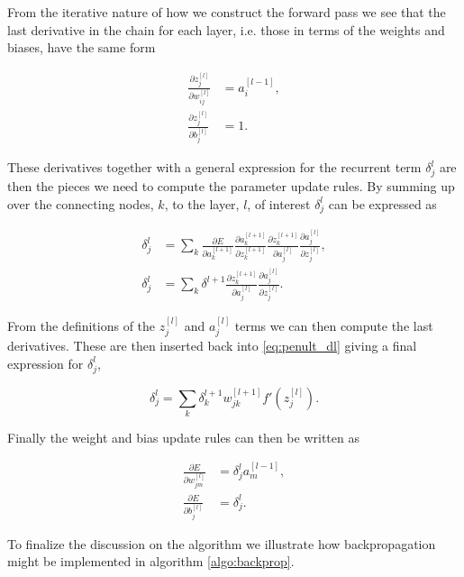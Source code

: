 \noindent From the iterative nature of how we construct the forward pass we see that the last derivative in the chain for each layer, i.e. those in terms of the weights and biases, have the same form 

\begin{align}
\frac{\partial z_j^{[l]}}{\partial w_{ij}^{[l]}} &= a^{[l-1]}_i, \\
\frac{\partial z_j^{[l]}}{\partial b_{j}^{[l]}} &= 1.
\end{align}

\noindent These derivatives together with a general expression for the recurrent term $\delta^l_j$ are then the pieces we need to compute the parameter update rules. By summing up over the connecting nodes, $k$, to the layer, $l$, of interest $\delta_j^l$ can be expressed as

\begin{align}
\delta_j^l &= 
\sum_k \frac{\partial E}{\partial a_k^{[l+1]}} 
\frac{\partial a_k^{[l+1]}}{\partial z_k^{[l+1]}} 
\frac{\partial z_k^{[l+1]}}{\partial a_j^{[l]}} 
\frac{\partial a_j^{[l]}}{\partial z_j^{[l]}},\\
\delta_j^l &= 
\sum_k \delta^{l+1} \frac{\partial z_k^{[l+1]}}{\partial a_j^{[l]}} 
\frac{\partial a_j^{[l]}}{\partial z_j^{[l]}} \label{eq:penult_dl}.
\end{align}

\noindent From the definitions of the $z_j^{[l]}$ and $a_j^{[l]}$ terms we can then compute the last derivatives. These are then inserted back into \ref{eq:penult_dl} giving a final expression for $\delta_j^l$,

\begin{equation}\label{eq:dl}
\delta_j^l = \sum_k \delta ^{l+1}_k w^{[l+1]}_{jk} f'(z_j^{[l]}).
\end{equation}

\noindent Finally the weight and bias update rules can then be written as 

\begin{align}
\frac{\partial E}{\partial w_{jm}^{[l]}} &= \delta_j^l a^{[l-1]}_m, \\
\frac{\partial E}{\partial b_{j}^{[l]}} &= \delta_j^l .
\end{align}

\noindent To finalize the discussion on the algorithm we illustrate how backpropagation might be implemented in algorithm \ref{algo:backprop}.


